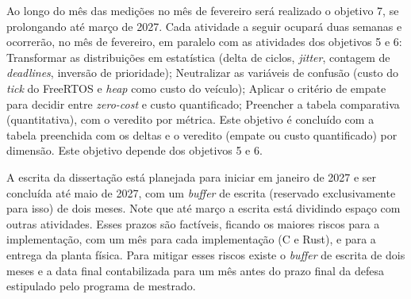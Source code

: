 Ao longo do mês das medições no mês de fevereiro será realizado o objetivo 7, se prolongando até março de 2027. Cada atividade a seguir ocupará duas semanas e ocorrerão, no mês de fevereiro, em paralelo com as atividades dos objetivos 5 e 6: Transformar as distribuições em estatística (delta de ciclos, \textit{jitter}, contagem de \textit{deadlines}, inversão de prioridade); Neutralizar as variáveis de confusão (custo do \textit{tick} do FreeRTOS e \textit{heap} como custo do veículo); Aplicar o critério de empate para decidir entre \textit{zero-cost} e custo quantificado; Preencher a tabela comparativa (quantitativa), com o veredito por métrica. Este objetivo é concluído com a tabela preenchida com os deltas e o veredito (empate ou custo quantificado) por dimensão. Este objetivo depende dos objetivos 5 e 6.

A escrita da dissertação está planejada para iniciar em janeiro de 2027 e ser concluída até maio de 2027, com um \textit{buffer} de escrita (reservado exclusivamente para isso) de dois meses. Note que até março a escrita está dividindo espaço com outras atividades. Esses prazos são factíveis, ficando os maiores riscos para a implementação, com um mês para cada implementação (C e Rust), e para a entrega da planta física. Para mitigar esses riscos existe o \textit{buffer} de escrita de dois meses e a data final contabilizada para um mês antes do prazo final da defesa estipulado pelo programa de mestrado.
